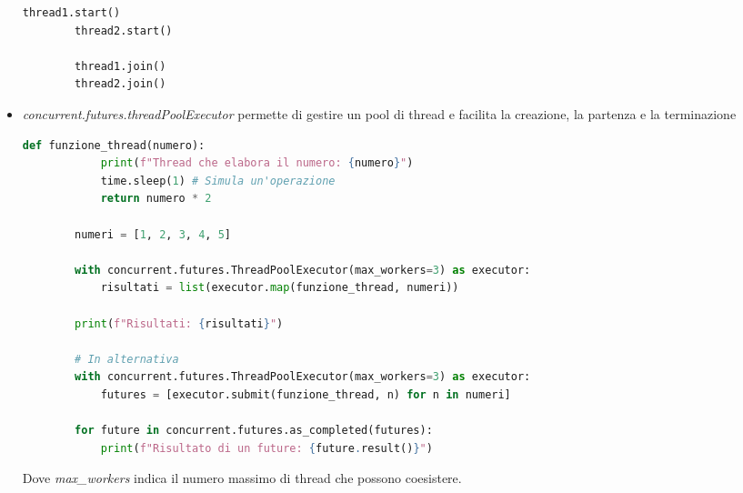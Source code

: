 \begin{itemize}
\begin{lstlisting}[language=Python]
		thread1.start()
		thread2.start()
		
		thread1.join()
		thread2.join()
	\end{lstlisting}
	\item \textit{concurrent.futures.threadPoolExecutor} permette di gestire un pool di thread e facilita la creazione, la partenza e la terminazione
	\begin{lstlisting}[language=Python]	
		def funzione_thread(numero):
			print(f"Thread che elabora il numero: {numero}")
			time.sleep(1) # Simula un'operazione
			return numero * 2
			
		numeri = [1, 2, 3, 4, 5]
		
		with concurrent.futures.ThreadPoolExecutor(max_workers=3) as executor:
			risultati = list(executor.map(funzione_thread, numeri))
		
		print(f"Risultati: {risultati}")
		
		# In alternativa
		with concurrent.futures.ThreadPoolExecutor(max_workers=3) as executor:
			futures = [executor.submit(funzione_thread, n) for n in numeri]
		
		for future in concurrent.futures.as_completed(futures):
			print(f"Risultato di un future: {future.result()}")
	\end{lstlisting}
	Dove \textit{max\_workers} indica il numero massimo di thread che possono coesistere.
\end{itemize}